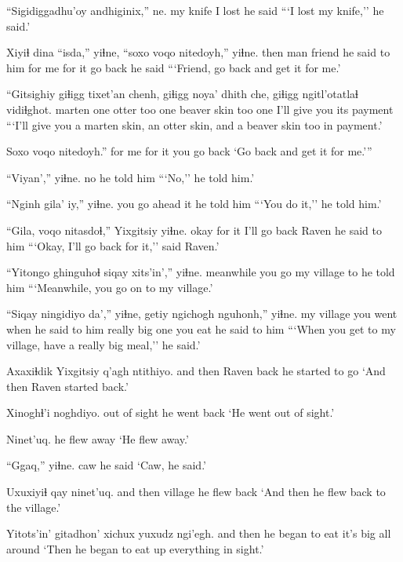 \documentclass[12pt]{article}
\begin{document}
\gll ``Sigidiggadhu'oy andhiginix,'' ne.
{my knife} {I lost} {he said}
\glt ```I lost my knife,'' he said.'
\glend

\gll Xiyiɬ dina ``isda,'' yiɬne,  ``soxo  voqo nitedoyh,'' yiɬne.
then man friend {he said to him} {for me} {for it} {go back} {he said}
\glt ```Friend, go back and get it for me.'
\glend

\gll ``Gitsighiy giɬigg tixet'an chenh,  giɬigg noya'  dhith che, giɬigg ngitl'otatlaɬ vidiɬghot.
marten  one  otter  too  one  beaver  skin too one  {I'll give you} {its payment}
\glt  ```I'll give you a marten skin, an otter skin, and a beaver skin too in payment.'
\glend

\gll Soxo voqo nitedoyh.''
{for me} {for it} {you go back}
\glt `Go back and get it for me.'''
\glend

\gll ``Viyan','' yiɬne.
no  {he told him}
\glt ```No,'' he told him.'
\glend

\gll ``Nginh gila' iy,'' yiɬne.
you  {go ahead} it {he told him}
\glt ```You do it,'' he told him.'
\glend

\gll ``Gila, voqo nitasdoɬ,'' Yixgitsiy yiɬne.
okay {for it} {I'll go back} Raven {he said to him}
\glt ```Okay, I'll go back for it,'' said Raven.'
\glend

\gll ``Yitongo ghinguhoɬ siqay  xits'in','' yiɬne.
meanwhile {you go} {my village} to {he told him}
\glt ```Meanwhile, you go on to my village.'
\glend

\gll ``Siqay ningidiyo da','' yiɬne, getiy ngichogh nguhonh,'' yiɬne.
{my village} {you went} when {he said to him} really {big one} {you eat} {he said to him}
\glt ```When you get to my village, have a really big meal,'' he said.'
\glend

\gll Axaxiɬdik Yixgitsiy q'agh ntithiyo.
{and then} Raven  back {he started to go}
\glt `And then Raven started back.'
\glend

\gll Xinoghɬ'i noghdiyo.
{out of sight} {he went back}
\glt `He went out of sight.'
\glend

\gll Ninet'uq.
{{he flew away}}
\glt `He flew away.'
\glend

\gll ``Ggaq,'' yiɬne.
caw  {he said}
\glt `Caw, he said.'
\glend

\gll Uxuxiyiɬ qay  ninet'uq.
{and then} village  {he flew back}
\glt `And then he flew back to the village.'
\glend

\gll Yitots'in' gitadhon'  xichux yuxudz ngi'egh.
{and then} {he began to eat} {it's big} all around
\glt `Then he began to eat up everything in sight.'
\glend
\end{document}
